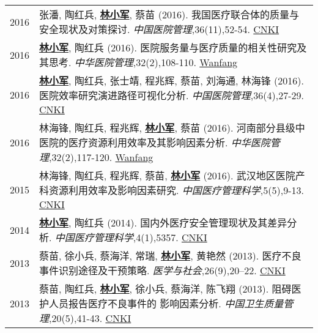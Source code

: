 \documentclass{resume}
\begin{document}
\begin{longtable}{r p{14cm}}
2016 & 张潘, 陶红兵,  \underline{\textbf{林小军}}, 蔡苗 (2016). 我国医疗联合体的质量与安全现状及对策探讨. \emph{中国医院管理},36(11),52-54. \href{http://kns.cnki.net/KCMS/detail/detail.aspx?dbcode=CJFQ&dbname=CJFDLAST2016&filename=YYGL201611027&v=MjM5Mjl1WnNGaXZtVTcvS1BEVE1Zckc0SDlmTnJvOUhZNFI4ZVgxTHV4WVM3RGgxVDNxVHJXTTFGckNVUkxLZVo=}{CNKI}\\
2016 & \underline{\textbf{林小军}}, 陶红兵 (2016). 医院服务量与医疗质量的相关性研究及其思考. \emph{中华医院管理},32(2),108-110. \href{http://www.wanfangdata.com.cn/details/detail.do?_type=perio&id=zhyygl201602010}{Wanfang}\\
2016 & \underline{\textbf{林小军}}, 陶红兵, 张士靖, 程兆辉, 蔡苗, 刘海通, 林海锋 (2016). 医院效率研究演进路径可视化分析. \emph{中国医院管理},36(4),27-29. \href{http://kns.cnki.net/KCMS/detail/detail.aspx?dbcode=CJFQ&dbname=CJFDLAST2016&filename=YYGL201604015&v=MjM5ODRSTEtlWnVadEZpRG5VNy9MUERUTVlyRzRIOWZNcTQ5RVlZUjhlWDFMdXhZUzdEaDFUM3FUcldNMUZyQ1U=}{CNKI}\\
2016 & 林海锋, 陶红兵, 程兆辉, \underline{\textbf{林小军}}, 蔡苗 (2016). 河南部分县级中医院的医疗资源利用效率及其影响因素分析. \emph{中华医院管理},32(2),117-120. \href{http://www.wanfangdata.com.cn/details/detail.do?_type=perio&id=zhyygl201602013}{Wanfang}\\
2015 & 林海锋, 陶红兵, 程兆辉, 蔡苗, \underline{\textbf{林小军}} (2016). 武汉地区医院产科资源利用效率及影响因素研究. \emph{中国医疗管理科学},5(5),9-13. \href{http://kns.cnki.net/KCMS/detail/detail.aspx?dbcode=CJFQ&dbname=CJFDLAST2015&filename=YLGL201505004&v=MjkxODIxTHV4WVM3RGgxVDNxVHJXTTFGckNVUkxLZVp1WnNGaXZtVkx2QVBDSE1Zckc0SDlUTXFvOUZZSVI4ZVg=}{CNKI}\\
2014 & \underline{\textbf{林小军}}, 陶红兵 (2014). 国内外医疗安全管理现状及其差异分析. \emph{中国医疗管理科学},4(1),5357. \href{http://kns.cnki.net/KCMS/detail/detail.aspx?dbcode=CJFQ&dbname=CJFD2014&filename=YLGL201401019&v=MjQzMzVUcldNMUZyQ1VSTEtlWnVadEZpRG5WNy9JUENITVlyRzRIOVhNcm85RWJZUjhlWDFMdXhZUzdEaDFUM3E=}{CNKI}\\
2013 & 蔡苗, 徐小兵, 蔡海洋, 常瑞, \underline{\textbf{林小军}}, 黄艳然 (2013). 医疗不良事件识别途径及干预策略. \emph{医学与社会},26(9),20–22. \href{http://kns.cnki.net/KCMS/detail/detail.aspx?dbcode=CJFQ&dbname=CJFDHIS2&filename=YXSH201309007&v=MDAwNDFyQ1VSTEtlWnVac0Zpdm1XcnZOUERYWVpyRzRIOUxNcG85Rlk0UjhlWDFMdXhZUzdEaDFUM3FUcldNMUY=}{CNKI}\\
2013 & 蔡苗, 陶红兵, \underline{\textbf{林小军}}, 徐小兵, 蔡海洋, 陈飞翔 (2013). 阻碍医护人员报告医疗不良事件的 影响因素分析. \emph{中国卫生质量管理},20(5),41-43. \href{http://kns.cnki.net/KCMS/detail/detail.aspx?dbcode=CJFQ&dbname=CJFDHIS2&filename=WSJG201305024&v=Mjc4MDIxTHV4WVM3RGgxVDNxVHJXTTFGckNVUkxLZVp1WnNGaXZuVXJ6Tk1qN0JhYkc0SDlMTXFvOUhZSVI4ZVg=}{CNKI}\\	
\end{longtable}
\end{document}
